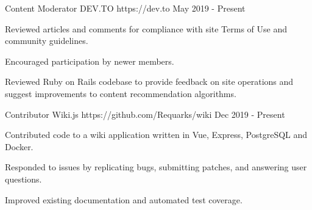 

\begin{cventries}

  \cventry
    {Content Moderator} %
    {DEV.TO} %
    {https://dev.to} %
    {May 2019 - Present} %
    {
      \begin{cvitems} %
        \item {Reviewed articles and comments for compliance with site Terms of Use and community guidelines.}
        \item {Encouraged participation by newer members.}
        \item {Reviewed Ruby on Rails codebase to provide feedback on site operations and suggest improvements to content recommendation algorithms.}
      \end{cvitems}
    }
    
  \cventry
    {Contributor} %
    {Wiki.js} %
    {https://github.com/Requarks/wiki} %
    {Dec 2019 - Present} %
    {
      \begin{cvitems} %
        \item {Contributed code to a wiki application written in Vue, Express, PostgreSQL and Docker.}
        \item {Responded to issues by replicating bugs, submitting patches, and answering user questions.}
        \item {Improved existing documentation and automated test coverage.}
      \end{cvitems}
    }


\end{cventries}
